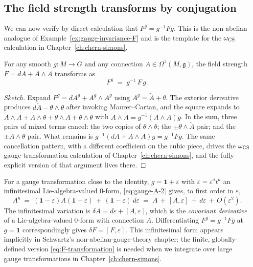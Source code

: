 \subsection{The field strength transforms by conjugation}

We can now verify by direct calculation that $F^g = g^{-1} F g$. This is the non-abelian analogue of Example~\ref{ex:gauge-invariance-F} and is the template for the $\omega_{\operatorname{CS}}$ calculation in Chapter~\ref{ch:chern-simons}.

\begin{theorem}\label{thm:F-transformation}
For any smooth $g : M \to G$ and any connection $A \in \Omega^1(M, \mathfrak{g})$, the field strength $F = dA + A\wedge A$ transforms as
\begin{equation}\label{eq:F-transformation}
F^g \;=\; g^{-1}\, F\, g.
\end{equation}
\end{theorem}

\begin{proof}[Sketch]
Expand $F^g = dA^g + A^g\wedge A^g$ using $A^g = \tilde A + \theta$. The exterior derivative produces $d\tilde A - \theta\wedge\theta$ after invoking Maurer--Cartan, and the square expands to $\tilde A\wedge\tilde A + \tilde A\wedge\theta + \theta\wedge\tilde A + \theta\wedge\theta$ with $\tilde A\wedge\tilde A = g^{-1}(A\wedge A)g$. In the sum, three pairs of mixed terms cancel: the two copies of $\theta\wedge\theta$; the $\pm\theta\wedge\tilde A$ pair; and the $\pm\tilde A\wedge\theta$ pair. What remains is $g^{-1}(dA + A\wedge A)g = g^{-1}Fg$. The same cancellation pattern, with a different coefficient on the cubic piece, drives the $\omega_{\operatorname{CS}}$ gauge-transformation calculation of Chapter~\ref{ch:chern-simons}, and the fully explicit version of that argument lives there.
\end{proof}

\begin{remark}\label{rem:infinitesimal-gauge}
For a gauge transformation close to the identity, $g = \mathbf{1} + \varepsilon$ with $\varepsilon = \varepsilon^a t^a$ an infinitesimal Lie-algebra-valued 0-form, \eqref{eq:gauge-A-2} gives, to first order in $\varepsilon$,
\begin{equation*}
A^g \;=\; (\mathbf{1} - \varepsilon) A (\mathbf{1} + \varepsilon) \,+\, (\mathbf{1} - \varepsilon)\, d\varepsilon \;=\; A \,+\, [A, \varepsilon] \,+\, d\varepsilon \,+\, O(\varepsilon^2).
\end{equation*}
The infinitesimal variation is $\delta A = d\varepsilon + [A, \varepsilon]$, which is the \emph{covariant derivative} of a Lie-algebra-valued 0-form with connection $A$. Differentiating $F^g = g^{-1}Fg$ at $g = \mathbf{1}$ correspondingly gives $\delta F = [F, \varepsilon]$. This infinitesimal form appears implicitly in Schwartz's non-abelian-gauge-theory chapter; the finite, globally-defined version \eqref{eq:F-transformation} is needed when we integrate over large gauge transformations in Chapter~\ref{ch:chern-simons}.
\end{remark}

